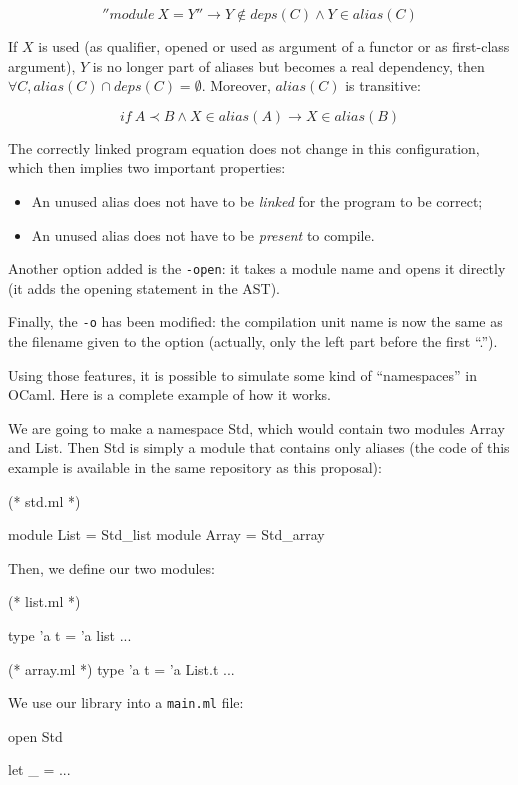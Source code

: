 \documentclass[11pt,a4paper]{article}
\begin{document}
$$''module~X = Y'' \rightarrow Y \notin deps(C) \land Y \in alias(C)$$ 

If $X$ is used (as qualifier, opened or used as argument of a functor or as
first-class argument), $Y$ is no longer part of aliases but becomes a real
dependency, then $\forall C, alias(C) \cap deps(C) = \emptyset$. Moreover,
$alias(C)$ is transitive:

$$if~ A \prec B \land X \in alias(A) \rightarrow X \in alias(B)$$

The correctly linked program equation does not change in this configuration,
which then implies two important properties:
\begin{itemize}
\item An unused alias does not have to be \emph{linked} for the program to be correct;
\item An unused alias does not have to be \emph{present} to compile.
\end{itemize}

Another option added is the \texttt{-open}: it takes a module name and opens it
directly (it adds the opening statement in the AST).

Finally, the \texttt{-o} has been modified: the compilation unit name is now the
same as the filename given to the option (actually, only the left part before
the first ``.'').

Using those features, it is possible to simulate some kind of ``namespaces'' in
OCaml. Here is a complete example of how it works.

We are going to make a namespace Std, which would contain two modules Array and
List. Then Std is simply a module that contains only aliases (the code of this
example is available in the same repository as this proposal):

\begin{OCaml}
(* std.ml *)

module List = Std_list
module Array = Std_array
\end{OCaml}

Then, we define our two modules:

\begin{OCaml}
(* list.ml *)

type 'a t = 'a list
...

(* array.ml *)
type 'a t = 'a List.t 
...
\end{OCaml}

We use our library into a \texttt{main.ml} file:

\begin{OCaml}
open Std

let _ = ...
\end{OCaml}
\end{document}
